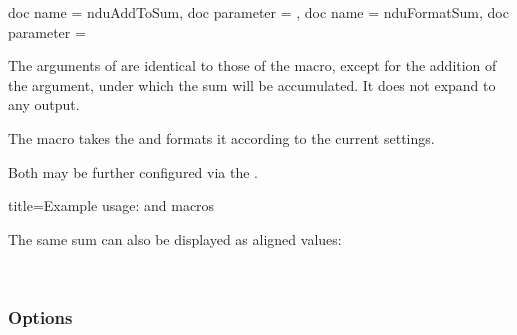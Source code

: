 \documentclass{article}
\begin{document}
\begin{docCommands}[]{
	{
		doc name = nduAddToSum,
		doc parameter = 
	},
	{
		doc name = nduFormatSum,
		doc parameter = 
	}
}

The arguments of  are identical to those of the  macro, except for the addition of the  argument, under which the sum will be accumulated. It does not expand to any output.

The  macro takes the  and formats it according to the current settings.

Both may be further configured via the .

\begin{dispExample*}{
	title=Example usage:  and  macros
}
\end{dispExample*}

The same sum can also be displayed as aligned values:

\begin{dispExample}
\\
\end{dispExample}
\end{docCommands}

\subsubsection{Options}
\end{document}
